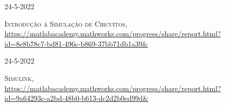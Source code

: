 \documentclass[10pt,a4paper,oneside]{article}
\newlength{\datewidth}
\newlength{\textindent}
\begin{document}
\begin{itemize}
\item[\hspace{\datewidth}\scriptsize 24-5-2022] \parbox[t]{\dimexpr\linewidth-\datewidth-\textindent}{\textsc{Introdução à Simulação de Circuítos}, \url{https://matlabacademy.mathworks.com/progress/share/report.html?id=8e8b78c7-bd81-496c-b869-37bb71db1a39&}}


\item[\hspace{\datewidth}\scriptsize 24-5-2022] \parbox[t]{\dimexpr\linewidth-\datewidth-\textindent}{\textsc{Simulink}, \url{https://matlabacademy.mathworks.com/progress/share/report.html?id=9a64293c-a2bd-48b0-b613-dc2d2b0ed99d&}}

	\end{itemize}
	
	\vspace{5mm}
	
\end{document}
